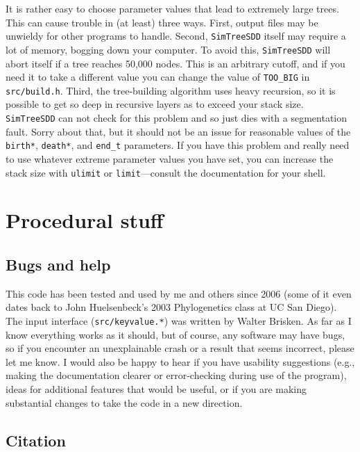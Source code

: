 \documentclass[10pt]{article}
\begin{document}
It is rather easy to choose parameter values that lead to extremely large trees.
This can cause trouble in (at least) three ways.
First, output files may be unwieldy for other programs to handle.
Second, \texttt{SimTreeSDD} itself may require a lot of memory, bogging down your computer.
To avoid this, \texttt{SimTreeSDD} will abort itself if a tree reaches 50,000 nodes.
This is an arbitrary cutoff, and if you need it to take a different value you can change the value of \texttt{TOO\_BIG} in \texttt{src/build.h}.
Third, the tree-building algorithm uses heavy recursion, so it is possible to get so deep in recursive layers as to exceed your stack size.
\texttt{SimTreeSDD} can not check for this problem and so just dies with a segmentation fault.  Sorry about that, but it should not be an issue for reasonable values of the \texttt{birth*}, \texttt{death*}, and \texttt{end\_t} parameters.
If you have this problem and really need to use whatever extreme parameter values you have set, you can increase the stack size with \texttt{ulimit} or \texttt{limit}---consult the documentation for your shell.


\section*{Procedural stuff}

\subsection*{Bugs and help}
This code has been tested and used by me and others since 2006 (some of it even dates back to John Huelsenbeck's 2003 Phylogenetics class at UC San Diego).
The input interface (\texttt{src/keyvalue.*}) was written by Walter Brisken.
As far as I know everything works as it should, but of course, any software may have bugs, so if you encounter an unexplainable crash or a result that seems incorrect, please let me know.
I would also be happy to hear if you have usability suggestions (e.g., making the documentation clearer or error-checking during use of the program), ideas for additional features that would be useful, or if you are making substantial changes to take the code in a new direction.

\subsection*{Citation}
\end{document}
